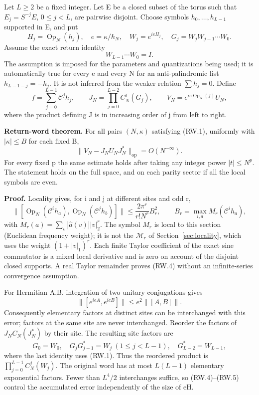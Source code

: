 Let \(L\geq2\) be a fixed integer. Let E be a closed subset of the torus such that \(E_j=S^{-j}E\), \(0\leq j<L\), are pairwise disjoint. Choose symbols \(h_0,\ldots,h_{L-1}\) supported in E, and put \[
 H_j=\operatorname{Op}_N(h_j),\quad e=\kappa/\hbar_N,
 \quad W_j=e^{ieH_j},\quad G_j=W_jW_{j-1}\cdots W_0.
\] Assume the exact return identity \[
                         W_{L-1}\cdots W_0=I.                 \tag{RW.1}
\] The assumption is imposed for the parameters and quantizations being used; it is automatically true for every e and every N for an anti-palindromic list \(h_{L-1-j}=-h_j\). It is not inferred from the weaker relation \(\sum h_j=0\). Define \[
 f=\sum_{j=0}^{L-1}\mathcal C^jh_j,\qquad
 J_N=\prod_{j=0}^{L-2}C_N^j(G_j),\qquad
 V_N=e^{ie\operatorname{Op}_N(f)}U_N,                         \tag{RW.2}
\] where the product defining J is in increasing order of j from left to right.

\textbf{Return-word theorem.} For all pairs \((N,\kappa)\) satisfying (RW.1), uniformly with \(|\kappa|\leq B\) for each fixed B, \[
             \|V_N-J_NU_NJ_N^*\|_{\mathrm{op}}=O(N^{-\infty}). \tag{RW.3}
\] For every fixed p the same estimate holds after taking any integer power \(|t|\leq N^p\). The statement holds on the full space, and on each parity sector if all the local symbols are even.

\textbf{Proof.} Locality gives, for i and j at different sites and odd r, \[
 \|[\operatorname{Op}_N(\mathcal C^ih_a),
          \operatorname{Op}_N(\mathcal C^jh_b)]\|
 \leq\frac{2\pi^r}{r!N^r}B_r^2,
 \qquad B_r=\max_{i,a}M_r(\mathcal C^ih_a),                  \tag{RW.4}
\] with \(M_r(a)=\sum_v|\widehat a(v)||v|_2^r\). The symbol \(M_r\) is local to this section (Euclidean frequency weight); it is not the \(\mathcal M_r\) of Section~\ref{sec:locality}, which uses the weight \((1+|v|_1)^r\). Each finite Taylor coefficient of the exact sine commutator is a mixed local derivative and is zero on account of the disjoint closed supports. A real Taylor remainder proves (RW.4) without an infinite-series convergence assumption.

For Hermitian A,B, integration of two unitary conjugations gives \[
 \|[e^{ieA},e^{ieB}]\|\leq e^2\|[A,B]\|.                  \tag{RW.5}
\] Consequently elementary factors at distinct sites can be interchanged with this error; factors at the same site are never interchanged. Reorder the factors of \(J_NC_N(J_N^*)\) by their site. The resulting site factors are \[
 G_0=W_0,\quad G_jG_{j-1}^*=W_j\ (1\leq j<L-1),\quad
 G_{L-2}^*=W_{L-1},                                        \tag{RW.6}
\] where the last identity uses (RW.1). Thus the reordered product is \(\prod_{j=0}^{L-1}C_N^j(W_j)\). The original word has at most \(L(L-1)\) elementary exponential factors. Fewer than \(L^4/2\) interchanges suffice, so (RW.4)--(RW.5) control the accumulated error independently of the size of eH.


